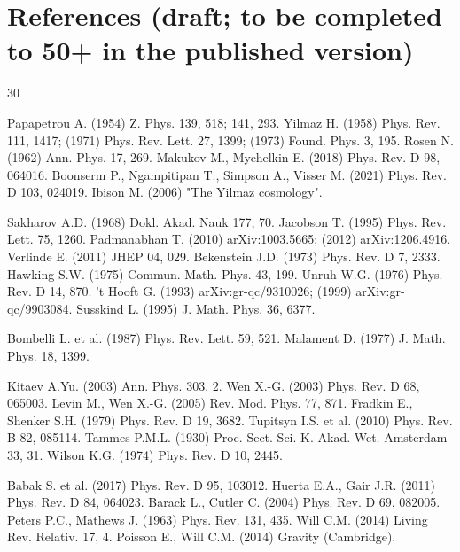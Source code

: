 \documentclass[12pt]{article}
\begin{document}
\section*{References (draft; to be completed to 50+ in the published version)}
\begin{thebibliography}{30}

 Papapetrou A. (1954) Z. Phys. 139, 518; 141, 293. 
 Yilmaz H. (1958) Phys. Rev. 111, 1417; (1971) Phys. Rev. Lett. 27, 1399; (1973) Found. Phys. 3, 195. 
 Rosen N. (1962) Ann. Phys. 17, 269. 
 Makukov M., Mychelkin E. (2018) Phys. Rev. D 98, 064016. 
 Boonserm P., Ngampitipan T., Simpson A., Visser M. (2021) Phys. Rev. D 103, 024019. 
 Ibison M. (2006) "The Yilmaz cosmology".

 Sakharov A.D. (1968) Dokl. Akad. Nauk 177, 70. 
 Jacobson T. (1995) Phys. Rev. Lett. 75, 1260. 
 Padmanabhan T. (2010) arXiv:1003.5665; (2012) arXiv:1206.4916. 
 Verlinde E. (2011) JHEP 04, 029. 
 Bekenstein J.D. (1973) Phys. Rev. D 7, 2333. 
 Hawking S.W. (1975) Commun. Math. Phys. 43, 199. 
 Unruh W.G. (1976) Phys. Rev. D 14, 870. 
 't Hooft G. (1993) arXiv:gr-qc/9310026; (1999) arXiv:gr-qc/9903084. 
 Susskind L. (1995) J. Math. Phys. 36, 6377.

 Bombelli L. et al. (1987) Phys. Rev. Lett. 59, 521. 
 Malament D. (1977) J. Math. Phys. 18, 1399.

 Kitaev A.Yu. (2003) Ann. Phys. 303, 2. 
 Wen X.-G. (2003) Phys. Rev. D 68, 065003. 
 Levin M., Wen X.-G. (2005) Rev. Mod. Phys. 77, 871. 
 Fradkin E., Shenker S.H. (1979) Phys. Rev. D 19, 3682. 
 Tupitsyn I.S. et al. (2010) Phys. Rev. B 82, 085114. 
 Tammes P.M.L. (1930) Proc. Sect. Sci. K. Akad. Wet. Amsterdam 33, 31. 
 Wilson K.G. (1974) Phys. Rev. D 10, 2445.

 Babak S. et al. (2017) Phys. Rev. D 95, 103012. 
 Huerta E.A., Gair J.R. (2011) Phys. Rev. D 84, 064023. 
 Barack L., Cutler C. (2004) Phys. Rev. D 69, 082005. 
 Peters P.C., Mathews J. (1963) Phys. Rev. 131, 435. 
 Will C.M. (2014) Living Rev. Relativ. 17, 4. 
 Poisson E., Will C.M. (2014) Gravity (Cambridge).

\end{thebibliography}
\end{document}
